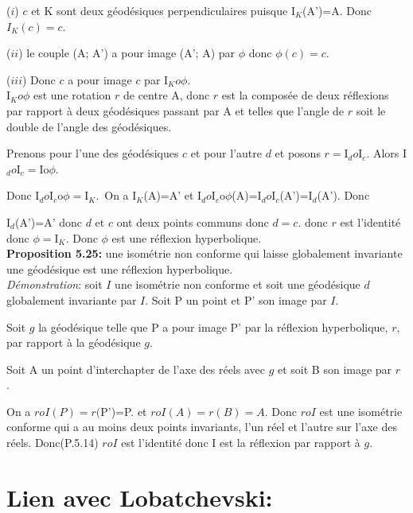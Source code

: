 \documentclass[a4paper, 12pt, twoside]{book}
\begin{document}
  ($i$) $c$ et K sont deux géodésiques perpendiculaires puisque I$_{K}$(A')=A. Donc $I_{K}(c)=c$.\
  
  ($ii$) le couple (A; A') a pour image (A'; A) par $\phi$ donc $\phi(c)=c$.\
  
  ($iii$) Donc $c$ a pour image $c$ par I$_{K}o\phi$.\\
  
  
  I$_{K}o\phi$ est une rotation $r$ de centre A, donc $r$ est la composée de deux réflexions par rapport à deux géodésiques passant par A et telles que l'angle de $r$ soit le double de l'angle des géodésiques.\
  
  Prenons pour l'une des géodésiques $c$ et pour l'autre $d$ et posons $r=$I$_{d}o$I$_{c}$. Alors  I$_{d}o$I$_{c}=$Io$\phi$.\
  
  Donc I$_{d}o$I$_{c}$o$\phi=$I$_{K}$.\
   On a I$_{K}$(A)=A' et I$_{d}o$I$_{c}$o$\phi$(A)=I$_{d}o$I$_{c}$(A')=I$_{d}$(A'). Donc\
   
   I$_{d}$(A')=A' donc $d$ et $c$ ont deux points communs donc $d=c$. donc $r$ est l'identité donc $\phi=$I$_{K}$. Donc $\phi$ est une réflexion hyperbolique.\\
  
 
  
  
  \textbf{Proposition 5.25:} une isométrie non conforme qui laisse globalement invariante une géodésique est une réflexion hyperbolique.\\
  
  \textit{Démonstration}: soit $I$ une isométrie non conforme et soit une géodésique $d$ globalement invariante par $I$. Soit P un point et P' son image par $I$.\
  
  Soit $g$ la géodésique telle que P a pour image P' par la réflexion hyperbolique, $r$, par rapport à la géodésique $g$.\
  
  
  Soit A un point d'interchapter  de l'axe des réels avec $g$ et soit B son image  par $r$.\
  
  On a $roI(P)=r($P')=P. et $roI(A)=r(B)=A$. Donc $roI$ est une isométrie conforme qui a au moins deux points invariants, l'un réel et l'autre sur l'axe des réels. Donc(P.5.14) $roI$ est l'identité donc I est la réflexion par rapport à $g$.\\
  
  


\newpage  \section{Lien avec Lobatchevski:}
\end{document}
